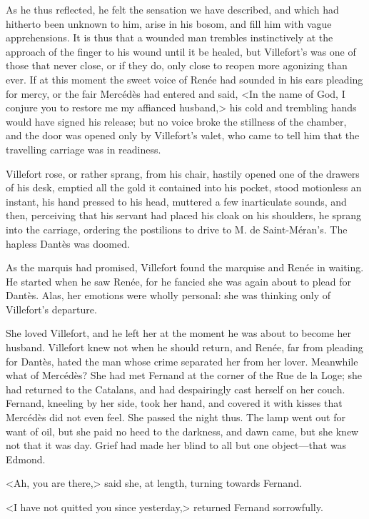  As he thus reflected, he felt the sensation we have described, and which had hitherto been unknown to him, arise in his bosom, and fill him with vague apprehensions. It is thus that a wounded man trembles instinctively at the approach of the finger to his wound until it be healed, but Villefort's was one of those that never close, or if they do, only close to reopen more agonizing than ever. If at this moment the sweet voice of Renée had sounded in his ears pleading for mercy, or the fair Mercédès had entered and said, <In the name of God, I conjure you to restore me my affianced husband,> his cold and trembling hands would have signed his release; but no voice broke the stillness of the chamber, and the door was opened only by Villefort's valet, who came to tell him that the travelling carriage was in readiness. 

 Villefort rose, or rather sprang, from his chair, hastily opened one of the drawers of his desk, emptied all the gold it contained into his pocket, stood motionless an instant, his hand pressed to his head, muttered a few inarticulate sounds, and then, perceiving that his servant had placed his cloak on his shoulders, he sprang into the carriage, ordering the postilions to drive to M. de Saint-Méran's. The hapless Dantès was doomed. 

 As the marquis had promised, Villefort found the marquise and Renée in waiting. He started when he saw Renée, for he fancied she was again about to plead for Dantès. Alas, her emotions were wholly personal: she was thinking only of Villefort's departure. 

 She loved Villefort, and he left her at the moment he was about to become her husband. Villefort knew not when he should return, and Renée, far from pleading for Dantès, hated the man whose crime separated her from her lover.  Meanwhile what of Mercédès? She had met Fernand at the corner of the Rue de la Loge; she had returned to the Catalans, and had despairingly cast herself on her couch. Fernand, kneeling by her side, took her hand, and covered it with kisses that Mercédès did not even feel. She passed the night thus. The lamp went out for want of oil, but she paid no heed to the darkness, and dawn came, but she knew not that it was day. Grief had made her blind to all but one object—that was Edmond. 

 <Ah, you are there,> said she, at length, turning towards Fernand. 

 <I have not quitted you since yesterday,> returned Fernand sorrowfully. 

